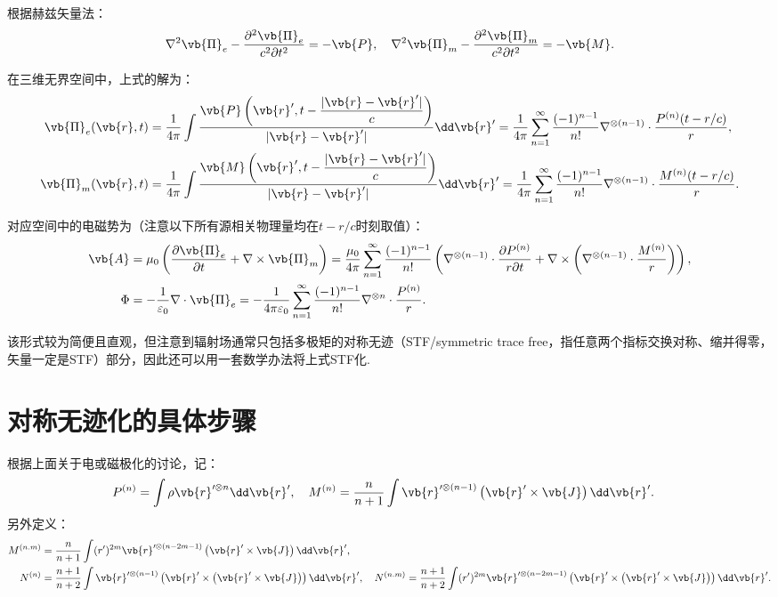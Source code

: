 根据赫兹矢量法：
\begin{align*}
	\nabla^2 \vb{\Pi}_e - \frac{\partial^2 \vb{\Pi}_e}{c^2 \partial t^2} = -\vb{P}, \quad \nabla^2 \vb{\Pi}_m - \frac{\partial^2 \vb{\Pi}_m}{c^2 \partial t^2} = -\vb{M}.
\end{align*}

在三维无界空间中，上式的解为：
\begin{align*}
	\vb{\Pi}_e(\vb{r}, t) &= \frac{1}{4\pi} \int \frac{\vb{P}\left( \vb{r}', t - \dfrac{|\vb{r} - \vb{r}'|}{c} \right)}{|\vb{r} - \vb{r}'|} \dd \vb{r}' = \frac{1}{4\pi} \sum_{n=1}^{\infty} \frac{(-1)^{n-1}}{n!} \nabla^{\otimes (n-1)} \cdot \frac{P^{(n)}(t-r/c)}{r}, \\
	\vb{\Pi}_m(\vb{r}, t) &= \frac{1}{4\pi} \int \frac{\vb{M}\left( \vb{r}', t - \dfrac{|\vb{r} - \vb{r}'|}{c} \right)}{|\vb{r} - \vb{r}'|} \dd \vb{r}' = \frac{1}{4\pi} \sum_{n=1}^{\infty} \frac{(-1)^{n-1}}{n!} \nabla^{\otimes (n-1)} \cdot \frac{M^{(n)}(t-r/c)}{r}.
\end{align*}

对应空间中的电磁势为（注意以下所有源相关物理量均在\(t-r/c\)时刻取值）：
\begin{align*}
	\vb{A} &= \mu_0 \left( \frac{\partial \vb{\Pi}_e}{\partial t} + \nabla \times \vb{\Pi}_m \right) = \frac{\mu_0}{4\pi} \sum_{n=1}^{\infty} \frac{(-1)^{n-1}}{n!} \left( \nabla^{\otimes (n-1)} \cdot \frac{\partial P^{(n)}}{r \partial t} + \nabla \times \left( \nabla^{\otimes (n-1)} \cdot \frac{M^{(n)}}{r} \right) \right), \\
	\Phi &= -\frac{1}{\varepsilon_0} \nabla \cdot \vb{\Pi}_e = -\frac{1}{4\pi\varepsilon_0} \sum_{n=1}^{\infty} \frac{(-1)^{n-1}}{n!} \nabla^{\otimes n} \cdot \frac{P^{(n)}}{r}.
\end{align*}

该形式较为简便且直观，但注意到辐射场通常只包括多极矩的对称无迹（STF/symmetric trace free，指任意两个指标交换对称、缩并得零，矢量一定是STF）部分，因此还可以用一套数学办法将上式STF化.

\section{对称无迹化的具体步骤}
根据上面关于电或磁极化的讨论，记：
\begin{align*}
	P^{(n)} &= \int \rho \vb{r}'^{\otimes n} \dd \vb{r}', \quad
	M^{(n)} = \frac{n}{n+1} \int \vb{r}'^{\otimes (n-1)} \left( \vb{r}' \times \vb{J} \right) \dd \vb{r}'.
\end{align*}
另外定义：
\begin{align*}
	M^{(n.m)} &= \frac{n}{n+1} \int (r')^{2m} \vb{r}'^{\otimes (n-2m-1)} \left( \vb{r}' \times \vb{J} \right) \dd \vb{r}', \\
	N^{(n)} &= \frac{n+1}{n+2} \int \vb{r}'^{\otimes (n-1)} \left( \vb{r}' \times \left( \vb{r}' \times \vb{J} \right) \right) \dd \vb{r}', \quad
	N^{(n.m)} = \frac{n+1}{n+2} \int (r')^{2m} \vb{r}'^{\otimes (n-2m-1)} \left( \vb{r}' \times \left( \vb{r}' \times \vb{J} \right) \right) \dd \vb{r}'.
\end{align*}

